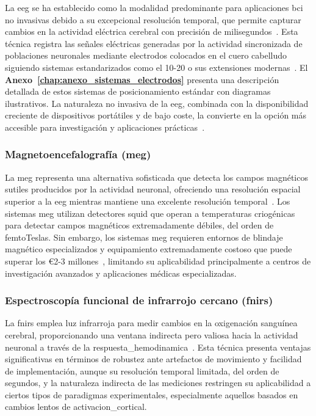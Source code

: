 La \acrfull{eeg} se ha establecido como la modalidad predominante para aplicaciones \acrshort{bci} no invasivas debido a su excepcional resolución temporal, que permite capturar cambios en la actividad eléctrica cerebral con precisión de milisegundos~\cite{eeg_bci_review,wolpaw2002brain}. Esta técnica registra las señales eléctricas generadas por la actividad sincronizada de poblaciones neuronales mediante electrodos colocados en el cuero cabelludo siguiendo sistemas estandarizados como el 10-20 o sus extensiones modernas~\cite{jasper1958report,klem1999ten}. El \textbf{Anexo~\ref{chap:anexo_sistemas_electrodos}} presenta una descripción detallada de estos sistemas de posicionamiento estándar con diagramas ilustrativos. La naturaleza no invasiva de la \acrshort{eeg}, combinada con la disponibilidad creciente de dispositivos portátiles y de bajo coste, la convierte en la opción más accesible para investigación y aplicaciones prácticas~\cite{sellers2006noninvasive}.

\subsubsection{Magnetoencefalografía (\acrshort{meg})}
\label{subsubsec:meg}

La \acrfull{meg} representa una alternativa sofisticada que detecta los campos magnéticos sutiles producidos por la actividad neuronal, ofreciendo una resolución espacial superior a la \acrshort{eeg} mientras mantiene una excelente resolución temporal~\cite{gramfort2013meg,hämäläinen1993magnetoencephalography}. Los sistemas \acrshort{meg} utilizan detectores \gls{squid} que operan a temperaturas criogénicas para detectar campos magnéticos extremadamente débiles, del orden de femtoTeslas. Sin embargo, los sistemas \acrshort{meg} requieren entornos de blindaje magnético especializados y equipamiento extremadamente costoso que puede superar los €2-3 millones~\cite{gramfort2013meg}, limitando su aplicabilidad principalmente a centros de investigación avanzados y aplicaciones médicas especializadas.

\subsubsection{Espectroscopía funcional de infrarrojo cercano (\acrshort{fnirs})}
\label{subsubsec:fnirs}

La \acrfull{fnirs} emplea luz infrarroja para medir cambios en la oxigenación sanguínea cerebral, proporcionando una ventana indirecta pero valiosa hacia la actividad neuronal a través de la \gls{respuesta_hemodinamica}~\cite{ferrari2012brief,pinti2020current}. Esta técnica presenta ventajas significativas en términos de robustez ante artefactos de movimiento y facilidad de implementación, aunque su resolución temporal limitada, del orden de segundos, y la naturaleza indirecta de las mediciones restringen su aplicabilidad a ciertos tipos de paradigmas experimentales, especialmente aquellos basados en cambios lentos de \gls{activacion_cortical}.


